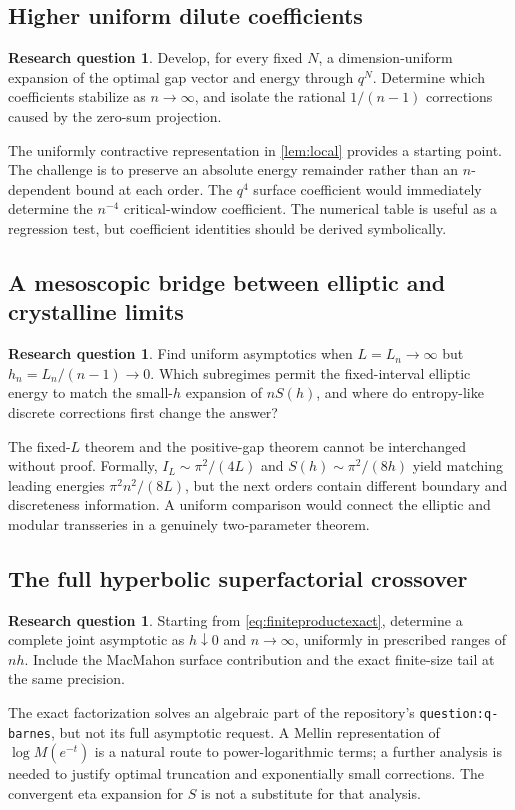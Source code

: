 \documentclass[11pt,a4paper]{article}
\theoremstyle{definition}
\newtheorem{question}[theorem]{Research question}
\theoremstyle{remark}
\begin{document}
\subsection{Higher uniform dilute coefficients}
\begin{question}
Develop, for every fixed $N$, a dimension-uniform expansion of the optimal
gap vector and energy through $q^N$. Determine which coefficients stabilize
as $n\to\infty$, and isolate the rational $1/(n-1)$ corrections caused by
the zero-sum projection.
\end{question}
The uniformly contractive representation in \cref{lem:local} provides a
starting point. The challenge is to preserve an absolute energy remainder
rather than an $n$-dependent bound at each order. The $q^4$ surface
coefficient would immediately determine the $n^{-4}$ critical-window
coefficient. The numerical table is useful as a regression test, but
coefficient identities should be derived symbolically.

\subsection{A mesoscopic bridge between elliptic and crystalline limits}
\begin{question}
Find uniform asymptotics when $L=L_n\to\infty$ but $h_n=L_n/(n-1)\to0$.
Which subregimes permit the fixed-interval elliptic energy to match the
small-$h$ expansion of $nS(h)$, and where do entropy-like discrete
corrections first change the answer?
\end{question}
The fixed-$L$ theorem and the positive-gap theorem cannot be interchanged
without proof. Formally, $I_L\sim\pi^2/(4L)$ and
$S(h)\sim\pi^2/(8h)$ yield matching leading energies
$\pi^2n^2/(8L)$, but the next orders contain different boundary and
discreteness information. A uniform comparison would connect the elliptic
and modular transseries in a genuinely two-parameter theorem.

\subsection{The full hyperbolic superfactorial crossover}
\begin{question}
Starting from \eqref{eq:finiteproductexact}, determine a complete joint
asymptotic as $h\downarrow0$ and $n\to\infty$, uniformly in prescribed
ranges of $nh$. Include the MacMahon surface contribution and the exact
finite-size tail at the same precision.
\end{question}
The exact factorization solves an algebraic part of the repository's
\texttt{question:q-barnes}, but not its full asymptotic request.
A Mellin representation of $\log M(e^{-t})$ is a natural route to
power-logarithmic terms; a further analysis is needed to justify optimal
truncation and exponentially small corrections. The convergent eta
expansion for $S$ is not a substitute for that analysis.
\end{document}
